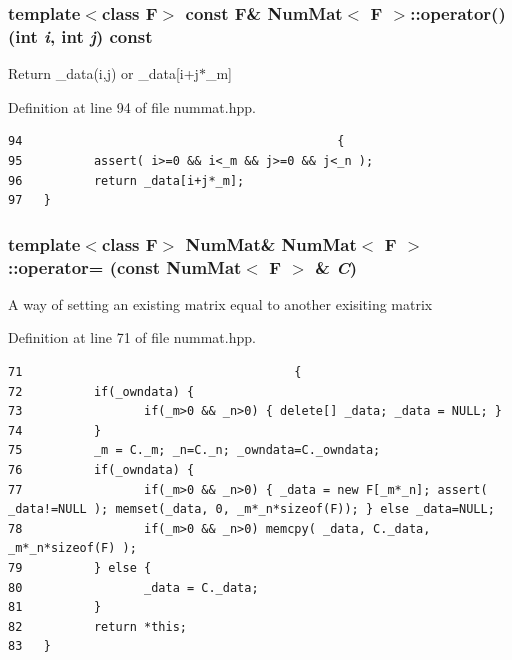 \subsubsection{\setlength{\rightskip}{0pt plus 5cm}template$<$class F$>$ const F\& {\bf Num\-Mat}$<$ F $>$::operator() (int {\em i}, int {\em j}) const\hspace{0.3cm}{\tt  [inline]}}\label{classNumMat_08092f91032a8a0df0ad0870710e6a7a_08092f91032a8a0df0ad0870710e6a7a}


Return \_\-data(i,j) or \_\-data[i+j$\ast$\_\-m] 

Definition at line 94 of file nummat.hpp.

\footnotesize\begin{verbatim}94                                            { 
95          assert( i>=0 && i<_m && j>=0 && j<_n );
96          return _data[i+j*_m];
97   }
\end{verbatim}\normalsize 


\subsubsection{\setlength{\rightskip}{0pt plus 5cm}template$<$class F$>$ {\bf Num\-Mat}\& {\bf Num\-Mat}$<$ F $>$::operator= (const {\bf Num\-Mat}$<$ F $>$ \& {\em C})\hspace{0.3cm}{\tt  [inline]}}\label{classNumMat_7e5baac1fa9ea6a2167d746fb6c83a4c_7e5baac1fa9ea6a2167d746fb6c83a4c}


A way of setting an existing matrix equal to another exisiting matrix 

Definition at line 71 of file nummat.hpp.

\footnotesize\begin{verbatim}71                                      {
72          if(_owndata) { 
73                 if(_m>0 && _n>0) { delete[] _data; _data = NULL; } 
74          }
75          _m = C._m; _n=C._n; _owndata=C._owndata;
76          if(_owndata) {
77                 if(_m>0 && _n>0) { _data = new F[_m*_n]; assert( _data!=NULL ); memset(_data, 0, _m*_n*sizeof(F)); } else _data=NULL;
78                 if(_m>0 && _n>0) memcpy( _data, C._data, _m*_n*sizeof(F) );
79          } else {
80                 _data = C._data;
81          }
82          return *this;
83   }
\end{verbatim}\normalsize 



